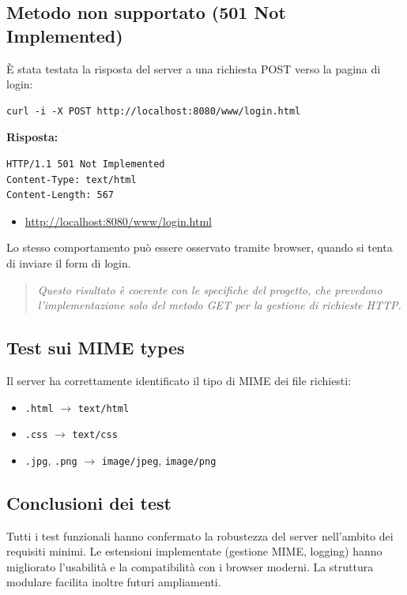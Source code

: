 \documentclass[a4paper,12pt]{report}
\begin{document}
\subsection{Metodo non supportato (501 Not Implemented)}
È stata testata la risposta del server a una richiesta POST verso la pagina di login:
\begin{verbatim}
curl -i -X POST http://localhost:8080/www/login.html
\end{verbatim}

\textbf{Risposta:}
\begin{verbatim}
HTTP/1.1 501 Not Implemented
Content-Type: text/html
Content-Length: 567
\end{verbatim}

\begin{itemize}
    \item \url{http://localhost:8080/www/login.html}
\end{itemize}
Lo stesso comportamento può essere osservato tramite browser, quando si tenta di inviare il form di login.

\vspace{0.5cm}

\begin{quote}
    \textit{Questo risultato è coerente con le specifiche del progetto, che prevedono l'implementazione solo del metodo GET per
        la gestione di richieste HTTP.}
\end{quote}

\subsection{Test sui MIME types}
Il server ha correttamente identificato il tipo di MIME dei file richiesti:
\begin{itemize}
    \item \texttt{.html} $\rightarrow$ \texttt{text/html}
    \item \texttt{.css} $\rightarrow$ \texttt{text/css}
    \item \texttt{.jpg}, \texttt{.png} $\rightarrow$ \texttt{image/jpeg}, \texttt{image/png}
\end{itemize}

\subsection{Conclusioni dei test}
Tutti i test funzionali hanno confermato la robustezza del server nell'ambito dei requisiti minimi. Le estensioni implementate (gestione MIME, logging)
hanno migliorato l'usabilità e la compatibilità con i browser moderni. La struttura modulare facilita inoltre futuri ampliamenti.
\end{document}
